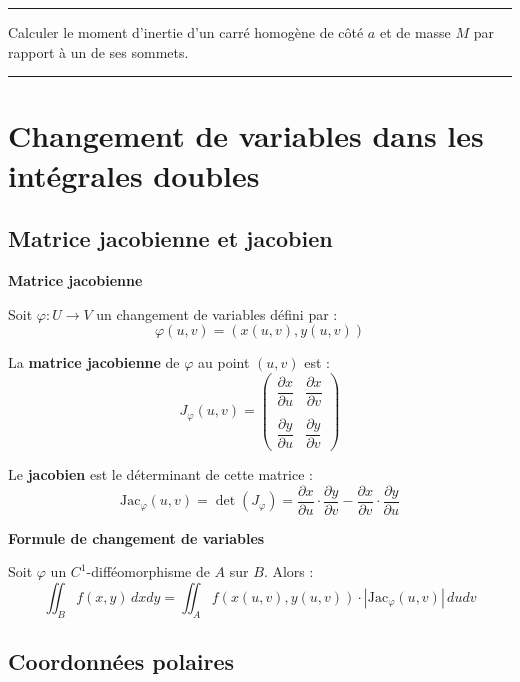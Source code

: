 \documentclass[../PolyS2.tex]{subfiles}
\begin{document}
\vspace{1em}\hrule\vspace{1em}


Calculer le moment d'inertie d'un carré homogène de côté $a$ et de masse $M$ par rapport à un de ses sommets.

\vspace{1em}\hrule\vspace{1em}

\newpage 

\section{Changement de variables dans les intégrales doubles}

\subsection{Matrice jacobienne et jacobien}

\begin{Def}\textbf{Matrice jacobienne}

Soit $\varphi : U \to V$ un changement de variables défini par :
$$\varphi(u,v) = (x(u,v), y(u,v))$$

La \textbf{matrice jacobienne} de $\varphi$ au point $(u,v)$ est :
$$J_\varphi(u,v) = \begin{pmatrix} \dfrac{\partial x}{\partial u} & \dfrac{\partial x}{\partial v} \\ \\ \dfrac{\partial y}{\partial u} & \dfrac{\partial y}{\partial v} \end{pmatrix}$$

Le \textbf{jacobien} est le déterminant de cette matrice :
$$\text{Jac}_\varphi(u,v) = \det(J_\varphi) = \frac{\partial x}{\partial u} \cdot \frac{\partial y}{\partial v} - \frac{\partial x}{\partial v} \cdot \frac{\partial y}{\partial u}$$
\end{Def}

\begin{Thm}\textbf{Formule de changement de variables}

Soit $\varphi$ un $C^1$-difféomorphisme de $A$ sur $B$. Alors :
$$\iint_B f(x,y) \, dxdy = \iint_A f(x(u,v), y(u,v)) \cdot |\text{Jac}_\varphi(u,v)| \, dudv$$
\end{Thm}

\subsection{Coordonnées polaires}
\end{document}
